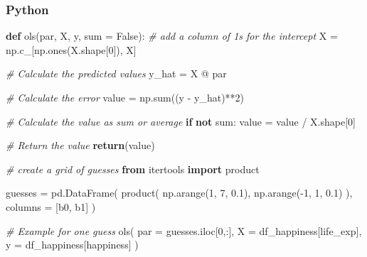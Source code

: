 \documentclass[
  letterpaper,
]{krantz}
\newenvironment{Shaded}{}{}
\newcommand{\BuiltInTok}[1]{\textcolor[rgb]{0.00,0.50,0.00}{#1}}
\newcommand{\CommentTok}[1]{\textcolor[rgb]{0.38,0.63,0.69}{\textit{#1}}}
\newcommand{\ControlFlowTok}[1]{\textcolor[rgb]{0.00,0.44,0.13}{\textbf{#1}}}
\newcommand{\DecValTok}[1]{\textcolor[rgb]{0.25,0.63,0.44}{#1}}
\newcommand{\FloatTok}[1]{\textcolor[rgb]{0.25,0.63,0.44}{#1}}
\newcommand{\ImportTok}[1]{\textcolor[rgb]{0.00,0.50,0.00}{\textbf{#1}}}
\newcommand{\KeywordTok}[1]{\textcolor[rgb]{0.00,0.44,0.13}{\textbf{#1}}}
\newcommand{\NormalTok}[1]{#1}
\newcommand{\OperatorTok}[1]{\textcolor[rgb]{0.40,0.40,0.40}{#1}}
\newcommand{\StringTok}[1]{\textcolor[rgb]{0.25,0.44,0.63}{#1}}
\newcommand{\VariableTok}[1]{\textcolor[rgb]{0.10,0.09,0.49}{#1}}
\begin{document}
\subsubsection{Python}

\begin{Shaded}
\begin{Highlighting}[]
\KeywordTok{def}\NormalTok{ ols(par, X, y, }\BuiltInTok{sum} \OperatorTok{=} \VariableTok{False}\NormalTok{):}
    \CommentTok{\# add a column of 1s for the intercept}
\NormalTok{    X }\OperatorTok{=}\NormalTok{ np.c\_[np.ones(X.shape[}\DecValTok{0}\NormalTok{]), X]}

    \CommentTok{\# Calculate the predicted values}
\NormalTok{    y\_hat }\OperatorTok{=}\NormalTok{ X }\OperatorTok{@}\NormalTok{ par}
    
    \CommentTok{\# Calculate the error}
\NormalTok{    value }\OperatorTok{=}\NormalTok{ np.}\BuiltInTok{sum}\NormalTok{((y }\OperatorTok{{-}}\NormalTok{ y\_hat)}\OperatorTok{**}\DecValTok{2}\NormalTok{)}
    
    \CommentTok{\# Calculate the value as sum or average}
    \ControlFlowTok{if} \KeywordTok{not} \BuiltInTok{sum}\NormalTok{:}
\NormalTok{        value }\OperatorTok{=}\NormalTok{ value }\OperatorTok{/}\NormalTok{ X.shape[}\DecValTok{0}\NormalTok{]}
    
    \CommentTok{\# Return the value}
    \ControlFlowTok{return}\NormalTok{(value)}

\CommentTok{\# create a grid of guesses}
\ImportTok{from}\NormalTok{ itertools }\ImportTok{import}\NormalTok{ product}

\NormalTok{guesses }\OperatorTok{=}\NormalTok{ pd.DataFrame(}
\NormalTok{    product(}
\NormalTok{        np.arange(}\DecValTok{1}\NormalTok{, }\DecValTok{7}\NormalTok{, }\FloatTok{0.1}\NormalTok{),}
\NormalTok{        np.arange(}\OperatorTok{{-}}\DecValTok{1}\NormalTok{, }\DecValTok{1}\NormalTok{, }\FloatTok{0.1}\NormalTok{)}
\NormalTok{    ),}
\NormalTok{    columns }\OperatorTok{=}\NormalTok{ [}\StringTok{\textquotesingle{}b0\textquotesingle{}}\NormalTok{, }\StringTok{\textquotesingle{}b1\textquotesingle{}}\NormalTok{]}
\NormalTok{)}

\CommentTok{\# Example for one guess}
\NormalTok{ols(}
\NormalTok{    par }\OperatorTok{=}\NormalTok{ guesses.iloc[}\DecValTok{0}\NormalTok{,:],}
\NormalTok{    X }\OperatorTok{=}\NormalTok{ df\_happiness[}\StringTok{\textquotesingle{}life\_exp\textquotesingle{}}\NormalTok{],}
\NormalTok{    y }\OperatorTok{=}\NormalTok{ df\_happiness[}\StringTok{\textquotesingle{}happiness\textquotesingle{}}\NormalTok{]}
\NormalTok{)}
\end{Highlighting}
\end{Shaded}
\end{document}
